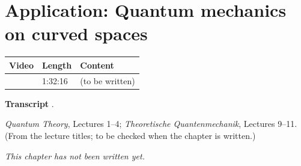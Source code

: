 \chapter{Application: Quantum mechanics on curved spaces}\label{ch:l26}
\begin{paracol}{2}

\begin{sources}
\begin{tabularx}{\linewidth}{@{}l l L@{}}
\toprule
\textbf{Video} & \textbf{Length} & \textbf{Content}\\
\midrule
{} & 1:32:16 & (to be written)\\
\bottomrule
\end{tabularx}

\smallskip
\textbf{Transcript} .
\end{sources}

\begin{reading}
\emph{Quantum Theory}, Lectures 1--4; \emph{Theoretische Quantenmechanik}, Lectures 9--11. (From the lecture titles; to be checked when the chapter is written.)
\end{reading}

\emph{This chapter has not been written yet.}

\flushside
\end{paracol}

